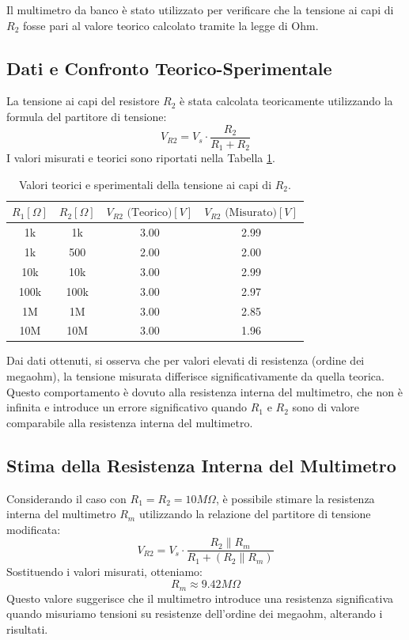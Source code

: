 \documentclass[a4paper,6pt]{article}
\begin{document}
Il multimetro da banco è stato utilizzato per verificare che la tensione ai capi di \(R_2\) fosse pari al valore teorico calcolato tramite la legge di Ohm.

\subsection{Dati e Confronto Teorico-Sperimentale}
La tensione ai capi del resistore \(R_2\) è stata calcolata teoricamente utilizzando la formula del partitore di tensione:
\[
V_{R2} = V_s \cdot \frac{R_2}{R_1 + R_2}
\]
I valori misurati e teorici sono riportati nella Tabella \ref{tab:risultati}.

\begin{table}[!ht]
    \centering
    \begin{tabular}{|c|c|c|c|}
        \hline
        \(R_1 [\Omega]\) & \(R_2 [\Omega]\) & \(V_{R2} \text{ (Teorico)} [V]\) & \(V_{R2} \text{ (Misurato)} [V]\) \\
        \hline
        1k & 1k & 3.00 & 2.99 \\
        1k & 500 & 2.00 & 2.00 \\
        10k & 10k & 3.00 & 2.99 \\
        100k & 100k & 3.00 & 2.97 \\
        1M & 1M & 3.00 & 2.85 \\
        10M & 10M & 3.00 & 1.96 \\
        \hline
    \end{tabular}
    \caption{Valori teorici e sperimentali della tensione ai capi di \(R_2\).}
    \label{tab:risultati}
\end{table}

Dai dati ottenuti, si osserva che per valori elevati di resistenza (ordine dei megaohm), la tensione misurata differisce significativamente da quella teorica. Questo comportamento è dovuto alla resistenza interna del multimetro, che non è infinita e introduce un errore significativo quando \(R_1\) e \(R_2\) sono di valore comparabile alla resistenza interna del multimetro.

\subsection{Stima della Resistenza Interna del Multimetro}
Considerando il caso con \(R_1 = R_2 = 10 M\Omega\), è possibile stimare la resistenza interna del multimetro \(R_m\) utilizzando la relazione del partitore di tensione modificata:
\[
V_{R2} = V_s \cdot \frac{R_2 \parallel R_m}{R_1 + (R_2 \parallel R_m)}
\]
Sostituendo i valori misurati, otteniamo:
\[
R_m \approx 9.42 M\Omega
\]
Questo valore suggerisce che il multimetro introduce una resistenza significativa quando misuriamo tensioni su resistenze dell'ordine dei megaohm, alterando i risultati.
\end{document}
